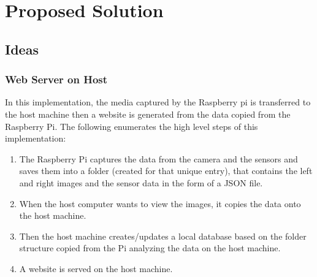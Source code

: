 \documentclass{article}
\begin{document}
\section{Proposed Solution}
\subsection{Ideas}
\subsubsection{Web Server on Host}
In this implementation, the media captured by the Raspberry pi is transferred to the host machine then a website is generated from the data copied from the Raspberry Pi. The following enumerates the high level steps of this implementation:
\begin{enumerate}
	\item The Raspberry Pi captures the data from the camera and the sensors and saves them into a folder (created for that unique entry), that contains the left and right images and the sensor data in the form of a JSON file.
	\item When the host computer wants to view the images, it copies the data onto the host machine.
	\item Then the host machine creates/updates a local database based on the folder structure copied from the Pi analyzing the data on the host machine.
	\item A website is served on the host machine.
\end{enumerate}
\end{document}

